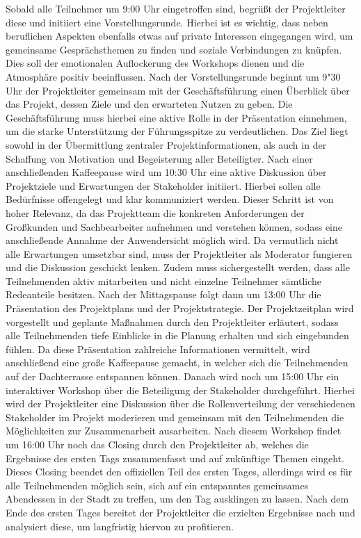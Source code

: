 Sobald alle Teilnehmer um 9:00 Uhr eingetroffen sind, begrüßt der Projektleiter diese und initiiert eine Vorstellungsrunde. Hierbei ist es wichtig, dass neben beruflichen Aspekten ebenfalls etwas auf private Interessen eingegangen wird, um gemeinsame Gesprächsthemen zu finden und soziale Verbindungen zu knüpfen. Dies soll der emotionalen Auflockerung des Workshops dienen und die Atmosphäre positiv beeinflussen. Nach der Vorstellungsrunde beginnt um 9"30 Uhr der Projektleiter gemeinsam mit der Geschäftsführung einen Überblick über das Projekt, dessen Ziele und den erwarteten Nutzen zu geben. Die Geschäftsführung muss hierbei eine aktive Rolle in der Präsentation einnehmen, um die starke Unterstützung der Führungsspitze zu verdeutlichen. Das Ziel liegt sowohl in der Übermittlung zentraler Projektinformationen, als auch in der Schaffung von Motivation und Begeisterung aller Beteiligter. Nach einer anschließenden Kaffeepause wird um 10:30 Uhr eine aktive Diskussion über Projektziele und Erwartungen der Stakeholder initiiert. Hierbei sollen alle Bedürfnisse offengelegt und klar kommuniziert werden. Dieser Schritt ist von hoher Relevanz, da das Projektteam die konkreten Anforderungen der Großkunden und Sachbearbeiter aufnehmen und verstehen können, sodass eine anschließende Annahme der Anwendersicht möglich wird. Da vermutlich nicht alle Erwartungen umsetzbar sind, muss der Projektleiter als Moderator fungieren und die Diskussion geschickt lenken. Zudem muss sichergestellt werden, dass alle Teilnehmenden aktiv mitarbeiten und nicht einzelne Teilnehmer sämtliche Redeanteile besitzen. Nach der Mittagspause folgt dann um 13:00 Uhr die Präsentation des Projektplans und der Projektstrategie. Der Projektzeitplan wird vorgestellt und geplante Maßnahmen durch den Projektleiter erläutert, sodass alle Teilnehmenden tiefe Einblicke in die Planung erhalten und sich eingebunden fühlen. Da diese Präsentation zahlreiche Informationen vermittelt, wird anschließend eine große Kaffeepause gemacht, in welcher sich die Teilnehmenden auf der Dachterrasse entspannen können. Danach wird noch um 15:00 Uhr ein interaktiver Workshop über die Beteiligung der Stakeholder durchgeführt. Hierbei wird der Projektleiter eine Diskussion über die Rollenverteilung der verschiedenen Stakeholder im Projekt moderieren und gemeinsam mit den Teilnehmenden die Möglichkeiten zur Zusammenarbeit ausarbeiten. Nach diesem Workshop findet um 16:00 Uhr noch das Closing durch den Projektleiter ab, welches die Ergebnisse des ersten Tags zusammenfasst und auf zukünftige Themen eingeht. Dieses Closing beendet den offiziellen Teil des ersten Tages, allerdings wird es für alle Teilnehmenden möglich sein, sich auf ein entspanntes gemeinsames Abendessen in der Stadt zu treffen, um den Tag ausklingen zu lassen.
Nach dem Ende des ersten Tages bereitet der Projektleiter die erzielten Ergebnisse nach und analysiert diese, um langfristig hiervon zu profitieren.
\vspace{10pt}

